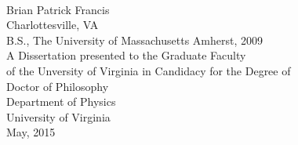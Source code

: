 \begin{titlepage}
  \centering
  \doublespacing
  
  \vspace*{0.5in}
  \textbf{\Large \@title}\\[0.75in]
  Brian Patrick Francis\\
  Charlottesville, VA\\[0.5in]
  B.S., The University of Massachusetts Amherst, 2009\\[1.5in]
  A Dissertation presented to the Graduate Faculty\\
  of the Unversity of Virginia in Candidacy for the Degree of\\
  Doctor of Philosophy\\[0.5in]
  Department of Physics\\[0.5in]
  University of Virginia\\
  May, 2015\\

\end{titlepage}